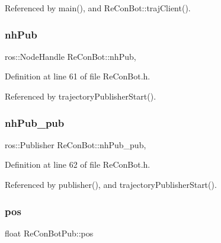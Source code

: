 Referenced by main(), and Re\+Con\+Bot\+::traj\+Client().

\mbox{\label{class_re_con_bot_a37edfe9c2dbbf37894c9bf850806fdd3}} 
\subsubsection{\texorpdfstring{nh\+Pub}{nhPub}}
{\footnotesize\ttfamily ros\+::\+Node\+Handle Re\+Con\+Bot\+::nh\+Pub\hspace{0.3cm}{\ttfamily [protected]}, {\ttfamily [inherited]}}



Definition at line 61 of file Re\+Con\+Bot.\+h.



Referenced by trajectory\+Publisher\+Start().

\mbox{\label{class_re_con_bot_a549b7542d286b690f38b7ece8b83850b}} 
\subsubsection{\texorpdfstring{nh\+Pub\+\_\+pub}{nhPub\_pub}}
{\footnotesize\ttfamily ros\+::\+Publisher Re\+Con\+Bot\+::nh\+Pub\+\_\+pub\hspace{0.3cm}{\ttfamily [protected]}, {\ttfamily [inherited]}}



Definition at line 62 of file Re\+Con\+Bot.\+h.



Referenced by publisher(), and trajectory\+Publisher\+Start().

\mbox{\label{class_re_con_bot_pub_a51311eed78ce3a444b35924c64ad3f4c}} 
\subsubsection{\texorpdfstring{pos}{pos}}
{\footnotesize\ttfamily float Re\+Con\+Bot\+Pub\+::pos\hspace{0.3cm}{\ttfamily [protected]}}



